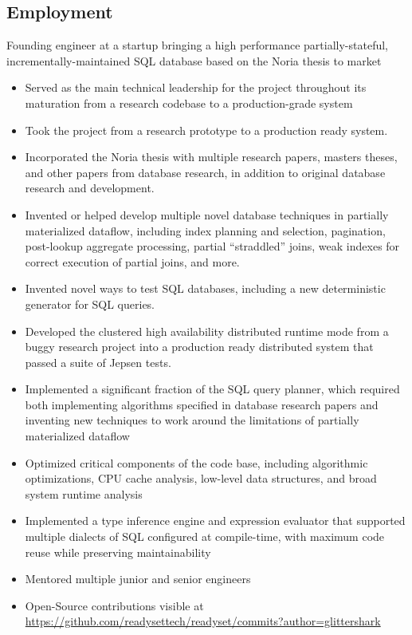 \documentclass[10pt,a4paper,sans]{moderncv}        %
\begin{document}
\subsection{Employment}
{Founding engineer at a startup bringing a high performance
  partially-stateful, incrementally-maintained SQL database based on the Noria
  thesis to market
  \begin{itemize}
    \item Served as the main technical leadership for the project throughout its
          maturation from a research codebase to a production-grade system
    \item Took the project from a research prototype to a production ready
          system.
    \item Incorporated the Noria thesis with multiple research papers,
          masters theses, and other papers from database research, in addition to
          original database research and development.
    \item Invented or helped develop multiple novel database techniques in
          partially materialized dataflow, including index planning and
          selection, pagination, post-lookup aggregate processing, partial
          ``straddled'' joins, weak indexes for correct execution of partial
          joins, and more.
    \item Invented novel ways to test SQL databases, including a new deterministic
          generator for SQL queries.
    \item Developed the clustered high availability distributed runtime mode from
          a buggy research project into a production ready distributed system
          that passed a suite of Jepsen tests.
    \item Implemented a significant fraction of the SQL query planner, which
          required both implementing algorithms specified in database research
          papers and inventing new techniques to work around the limitations of
          partially materialized dataflow
    \item Optimized critical components of the code base, including algorithmic
          optimizations, CPU cache analysis, low-level data structures, and
          broad system runtime analysis
    \item Implemented a type inference engine and expression evaluator that
          supported multiple dialects of SQL configured at compile-time, with
          maximum code reuse while preserving maintainability
    \item Mentored multiple junior and senior engineers
    \item Open-Source contributions visible at
          \url{https://github.com/readysettech/readyset/commits?author=glittershark}
  \end{itemize}}
\end{document}
